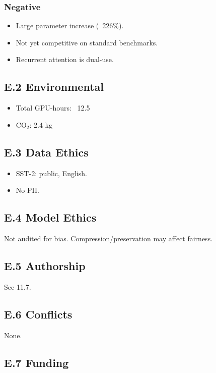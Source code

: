 \subsubsection{Negative}
\begin{itemize}
\item Large parameter increase (~226\%).
\item Not yet competitive on standard benchmarks.
\item Recurrent attention is dual-use.

\end{itemize}
\subsection{E.2 Environmental}

\begin{itemize}
\item Total GPU-hours: ~12.5
\item CO$_2$: 2.4 kg

\end{itemize}
\subsection{E.3 Data Ethics}

\begin{itemize}
\item SST-2: public, English.
\item No PII.

\end{itemize}
\subsection{E.4 Model Ethics}

Not audited for bias. Compression/preservation may affect fairness.

\subsection{E.5 Authorship}

See  11.7.

\subsection{E.6 Conflicts}

None.

\subsection{E.7 Funding}

